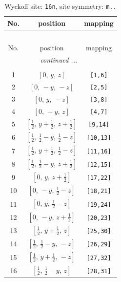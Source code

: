 \documentclass[fleqn,8pt]{jsarticle}
\begin{document}
\renewcommand{\arraystretch}{1.2}
\begin{longtable}{ccc}
\caption{Wyckoff site: {\tt 16n}, site symmetry: {\tt m..}}
 \\
 \hline \hline
No. & position & mapping \\ \hline \endfirsthead

\multicolumn{2}{l}{\tablename\ \thetable{}} \\
 \hline \hline
No. & position & mapping \\ \hline \endhead

 \hline \hline
\multicolumn{2}{r}{\footnotesize\it continued ...} \\ \endfoot

 \hline \hline
\multicolumn{2}{r}{} \\ \endlastfoot

1 & $\left[ 0,\, y,\, z \right]$ & {\tt [1,6]} \\ \hline
2 & $\left[ 0,\, - y,\, - z \right]$ & {\tt [2,5]} \\ \hline
3 & $\left[ 0,\, y,\, - z \right]$ & {\tt [3,8]} \\ \hline
4 & $\left[ 0,\, - y,\, z \right]$ & {\tt [4,7]} \\ \hline
5 & $\left[ \frac{1}{2},\, y + \frac{1}{2},\, z + \frac{1}{2} \right]$ & {\tt [9,14]} \\ \hline
6 & $\left[ \frac{1}{2},\, \frac{1}{2} - y,\, \frac{1}{2} - z \right]$ & {\tt [10,13]} \\ \hline
7 & $\left[ \frac{1}{2},\, y + \frac{1}{2},\, \frac{1}{2} - z \right]$ & {\tt [11,16]} \\ \hline
8 & $\left[ \frac{1}{2},\, \frac{1}{2} - y,\, z + \frac{1}{2} \right]$ & {\tt [12,15]} \\ \hline
9 & $\left[ 0,\, y,\, z + \frac{1}{2} \right]$ & {\tt [17,22]} \\ \hline
10 & $\left[ 0,\, - y,\, \frac{1}{2} - z \right]$ & {\tt [18,21]} \\ \hline
11 & $\left[ 0,\, y,\, \frac{1}{2} - z \right]$ & {\tt [19,24]} \\ \hline
12 & $\left[ 0,\, - y,\, z + \frac{1}{2} \right]$ & {\tt [20,23]} \\ \hline
13 & $\left[ \frac{1}{2},\, y + \frac{1}{2},\, z \right]$ & {\tt [25,30]} \\ \hline
14 & $\left[ \frac{1}{2},\, \frac{1}{2} - y,\, - z \right]$ & {\tt [26,29]} \\ \hline
15 & $\left[ \frac{1}{2},\, y + \frac{1}{2},\, - z \right]$ & {\tt [27,32]} \\ \hline
16 & $\left[ \frac{1}{2},\, \frac{1}{2} - y,\, z \right]$ & {\tt [28,31]} \\
\end{longtable}
\end{document}
